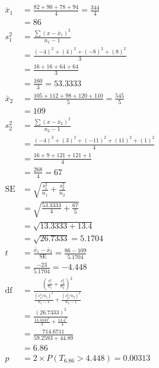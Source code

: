 \begin{align*}
\bar{x}_1 &= \frac{82 + 90 + 78 + 94}{4} = \frac{344}{4} \\
 &= 86 \\
s_1^2 &= \frac{\sum (x - \bar{x}_1)^2}{n_1 - 1} \\
 &= \frac{(-4)^2 + (4)^2 + (-8)^2 + (8)^2}{3} \\
 &= \frac{16 + 16 + 64 + 64}{3} \\
 &= \frac{160}{3} = 53.3333 \\
\bar{x}_2 &= \frac{105 + 112 + 98 + 120 + 110}{5} = \frac{545}{5} \\
 &= 109 \\
s_2^2 &= \frac{\sum (x - \bar{x}_2)^2}{n_2 - 1} \\
 &= \frac{(-4)^2 + (3)^2 + (-11)^2 + (11)^2 + (1)^2}{4} \\
 &= \frac{16 + 9 + 121 + 121 + 1}{4} \\
 &= \frac{268}{4} = 67 \\
\mathrm{SE} &= \sqrt{\frac{s_1^2}{n_1} + \frac{s_2^2}{n_2}} \\
 &= \sqrt{\frac{53.3333}{4} + \frac{67}{5}} \\
 &= \sqrt{13.3333 + 13.4} \\
 &= \sqrt{26.7333} = 5.1704 \\
t &= \frac{\bar{x}_1 - \bar{x}_2}{\mathrm{SE}} = \frac{86 - 109}{5.1704} \\
 &= \frac{-23}{5.1704} = -4.448 \\
\mathrm{df} &= \frac{\left(\frac{s_1^2}{n_1} + \frac{s_2^2}{n_2}\right)^2}{\frac{(s_1^2/n_1)^2}{n_1 - 1} + \frac{(s_2^2/n_2)^2}{n_2 - 1}} \\
 &= \frac{(26.7333)^2}{\frac{13.3333^2}{3} + \frac{13.4^2}{4}} \\
 &= \frac{714.6711}{59.2593 + 44.89} \\
 &= 6.86 \\
p &= 2 \times P(T_{6.86} > 4.448) = 0.00313
\end{align*}
